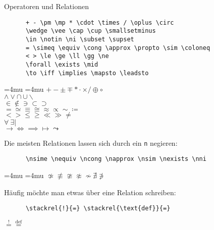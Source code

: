 \begin{frame}[fragile]{Operatoren und Relationen}
  \vspace{-1em}
  \begin{CodeExample}{0.74}
    \begin{lstlisting}
      + - \pm \mp * \cdot \times / \oplus \circ
      \wedge \vee \cap \cup \smallsetminus
      \in \notin \ni \subset \supset
      = \simeq \equiv \cong \approx \propto \sim \coloneq
      < > \le \ge \ll \gg \ne
      \forall \exists \mid
      \to \iff \implies \mapsto \leadsto
    \end{lstlisting}
  \CodeResult
    \Umathbinbinspacing\textstyle=4mu
    \Umathrelrelspacing\textstyle=4mu
    $+ - \pm \mp * \cdot \times / \oplus \circ$ \\
    $\wedge \vee \cap \cup \smallsetminus$ \\
    $\in \notin \ni \subset \supset$ \\
    $= \simeq \equiv \cong \approx \propto \sim \coloneq$ \\
    $< > \le \ge \ll \gg \ne$ \\
    $\forall \: \exists \mid$ \\
    $\to \iff \implies \mapsto \leadsto$
  \end{CodeExample}
  \vspace{5pt}
  Die meisten Relationen lassen sich durch ein \texttt{n} negieren:
  \vspace{-1.5em}
  \begin{CodeExample}{0.74}
    \begin{lstlisting}
      \nsime \nequiv \ncong \napprox \nsim \nexists \nni
    \end{lstlisting}
  \CodeResult
    \Umathbinbinspacing\textstyle=4mu
    \Umathrelrelspacing\textstyle=4mu
    $\nsime \nequiv \ncong \napprox \nsim \nexists \nni$
  \end{CodeExample}
  \vspace{5pt}
  Häufig möchte man etwas über eine Relation schreiben:
  \vspace{-1.5em}
  \begin{CodeExample}{0.74}
    \begin{lstlisting}
      \stackrel{!}{=} \stackrel{\text{def}}{=}
    \end{lstlisting}
  \CodeResult
    $\stackrel{!}{=} \stackrel{\text{def}}{=}$
  \end{CodeExample}
\end{frame}

